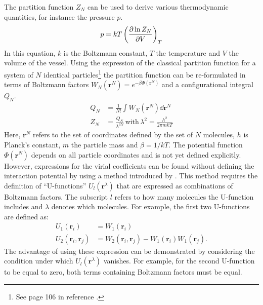 The partition function $Z_N$ can be used to derive various thermodynamic
quantities, for instance the pressure $p$.
%
\begin{align}
    p=kT\left(\pdv{\ln Z_N}{V}\right)_T\label{eqn:PressureEquationOfState}
\end{align}
%
In this equation, $k$ is the Boltzmann constant, $T$ the temperature and $V$ the
volume of the vessel. Using the expression of the classical partition function
for a system of $N$ identical particles\footnote{See page 106 in reference
\cite{Hirschfelder_Moleculartheorygases_1964}.} the partition function can be
re-formulated in terms of Boltzmann factors
$W_N\left(\mathbf{r}^N\right)=e^{-\beta\Phi\left(\mathbf{r}^N\right)}$ and a
configurational integral $Q_N$.
%
\begin{align}
    Q_N&=\frac{1}{N!}\int W_N\left(\mathbf{r}^N\right)\dd{\mathbf{r}^N}\label{eqn:ConfigurationalIntegral}\\
    Z_N&=\frac{Q_N}{\lambda^{3N}}\,\text{with}\, \lambda^2=\frac{h^2}{2\pi mkT}\label{eqn:PartitionFunction}
\end{align}
%
Here, $\mathbf{r}^N$ refers to the set of coordinates defined by the set of $N$
molecules, $h$ is Planck's constant, $m$ the particle mass and $\beta=1/kT$. The
potential function $\Phi\left(\mathbf{r}^N\right)$ depends on all particle
coordinates and is not yet defined explicitly. However, expressions for the
virial coefficients can be found without defining the interaction potential by
using a method introduced by
\citeauthor{Ursell_evaluationGibbsphaseintegral_1927}\autocite{Ursell_evaluationGibbsphaseintegral_1927}.
This method requires the definition of ``U-functions''
$U_l\left(\mathbf{r}^\lambda\right)$ that are expressed as combinations of
Boltzmann factors. The subscript $l$ refers to how many molecules the U-function
includes and $\lambda$ denotes which molecules. For example, the first two
U-functions are defined as:
%
\begin{align}
    U_1\left(\mathbf{r}_i\right)&=W_1\left(\mathbf{r}_i\right)\\
    U_2\left(\mathbf{r}_i,\mathbf{r}_j\right)&=W_2\left(\mathbf{r}_i,\mathbf{r}_j\right)-W_1\left(\mathbf{r}_i\right)W_1\left(\mathbf{r}_j\right).
\end{align}
%
The advantage of using these expression can be demonstrated by considering the
condition under which $U_l\left(\mathbf{r}^\lambda\right)$ vanishes. For
example, for the second U-function to be equal to zero, both terms containing
Boltzmann factors must be equal.
